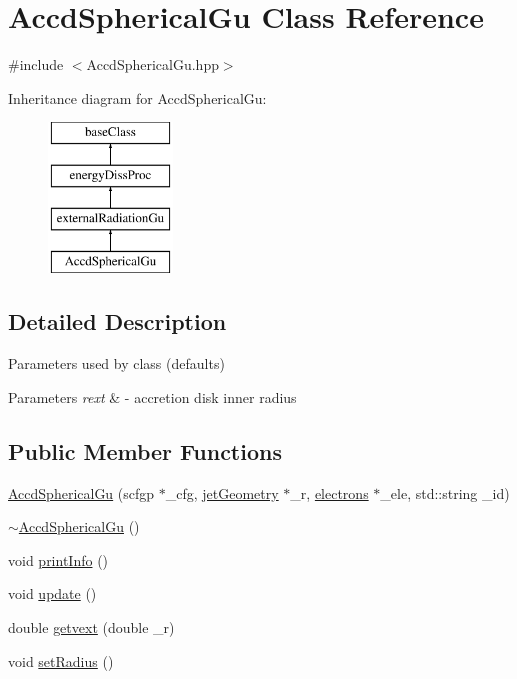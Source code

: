 \hypertarget{classAccdSphericalGu}{\section{Accd\-Spherical\-Gu Class Reference}
\label{classAccdSphericalGu}
}


{\ttfamily \#include $<$Accd\-Spherical\-Gu.\-hpp$>$}

Inheritance diagram for Accd\-Spherical\-Gu\-:\begin{figure}[H]
\begin{center}
\leavevmode
\includegraphics[height=4.000000cm]{classAccdSphericalGu}
\end{center}
\end{figure}


\subsection{Detailed Description}
Parameters used by class (defaults) 
\begin{DoxyParams}{Parameters}
{\em rext} & -\/ accretion disk inner radius \\
\hline
\end{DoxyParams}
\subsection*{Public Member Functions}
\begin{DoxyCompactItemize}
\item 
\hyperlink{classAccdSphericalGu_a0ce695a3b46e6027bb770e6b9c2ac2ae}{Accd\-Spherical\-Gu} (scfgp $\ast$\-\_\-cfg, \hyperlink{classjetGeometry}{jet\-Geometry} $\ast$\-\_\-r, \hyperlink{classelectrons}{electrons} $\ast$\-\_\-ele, std\-::string \-\_\-id)
\item 
\hyperlink{classAccdSphericalGu_ad5dfde0d63207ba0c2a14d6e8f9561e4}{$\sim$\-Accd\-Spherical\-Gu} ()
\item 
void \hyperlink{classAccdSphericalGu_a672f673606422556c3fb31a1787c6724}{print\-Info} ()
\item 
void \hyperlink{classAccdSphericalGu_a278cae9b07c99dd7398121a77fa069c9}{update} ()
\item 
double \hyperlink{classAccdSphericalGu_a802ac0782b844446953d4b59da160e46}{getvext} (double \-\_\-r)
\item 
void \hyperlink{classAccdSphericalGu_a606c270f0d33338544b48373fe294f6b}{set\-Radius} ()
\end{DoxyCompactItemize}
